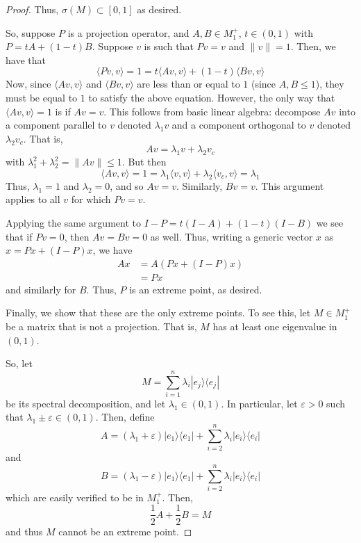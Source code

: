\documentclass[fontsize=11pt]{scrartcl} %
\numberwithin{equation}{section} %
\numberwithin{figure}{section} %
\numberwithin{table}{section} %
\newcommand{\la}{\langle}
\newcommand{\ra}{\rangle}
\begin{document}
\begin{proof}
    Thus, $\sigma(M)\subset [0,1]$ as desired.

    So, suppose $P$ is a projection operator, and $A,B\in M_1^+$, $t\in (0,1)$
    with $P=tA+(1-t)B$. Suppose $v$ is such that $Pv=v$ and $\|v\|=1$. Then, we
    have that
    \[
        \langle Pv,v\rangle = 1 = t\langle Av,v\rangle + (1-t)\langle
        Bv,v\rangle
    \]
    Now, since $\langle Av,v\rangle$ and $\langle Bv,v\rangle$ are less than or
    equal to $1$ (since $A,B\leq 1$), they must be equal to $1$ to satisfy the
    above equation. However, the only way that $\langle Av,v\rangle=1$ is if
    $Av=v$. This follows from basic linear algebra: decompose $Av$ into a
    component parallel to $v$ denoted $\lambda_1v$ and a component orthogonal to
    $v$ denoted $\lambda_2v_c$. That is,
    \[
        Av = \lambda_1v+\lambda_2v_c
    \]
    with $\lambda_1^2 + \lambda_2^2 = \|Av\|\leq 1$. But then
    \[
        \langle Av,v\rangle = 1 = \lambda_1\langle v,v\rangle + \lambda_2\langle
        v_c,v\rangle = \lambda_1
    \]
    Thus, $\lambda_1=1$ and $\lambda_2=0$, and so $Av=v$. Similarly, $Bv=v$.
    This argument applies to all $v$ for which $Pv=v$.

    Applying the same argument to $I-P = t(I-A) +(1-t)(I-B)$ we see that if
    $Pv=0$, then $Av=Bv=0$ as well. Thus, writing a generic vector $x$ as
    $x= Px + (I-P)x$, we have
    \[
        \begin{aligned}
            Ax &= A(Px + (I-P)x)\\
            &= Px
    \end{aligned}
    \]
    and similarly for $B$. Thus, $P$ is an extreme point, as desired.

    Finally, we show that these are the only extreme points. To see this, let
    $M\in M_1^+$ be a matrix that is not a projection. That is, $M$ has at least
    one eigenvalue in $(0,1)$. 

    So, let
    \[
        M = \sum_{i=1}^n \lambda_i|e_j\ra\la e_j|
    \]
    be its spectral decomposition, and let $\lambda_1\in(0,1)$. In particular,
    let $\varepsilon>0$ such that $\lambda_1\pm \varepsilon\in (0,1)$. Then,
    define 
    \[
        A = (\lambda_1+\varepsilon)|e_1\ra\la e_1| +
    \sum_{i=2}^n\lambda_i|e_i\ra\la e_i|
    \]
    and
    \[
        B = (\lambda_1-\varepsilon)|e_1\ra\la e_1| +
    \sum_{i=2}^n\lambda_i|e_i\ra\la e_i|
    \]
    which are easily verified to be in $M_1^+$. Then,
    \[
        \frac{1}{2}A + \frac{1}{2}B = M
    \]
    and thus $M$ cannot be an extreme point.
\end{proof}
\end{document}

